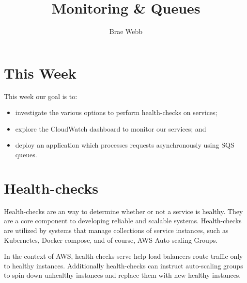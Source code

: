 \documentclass{csse4400}
\title{Monitoring \& Queues}
\author{Brae Webb}
\date{\week{6}}
\begin{document}
\maketitle

\section{This Week}
This week our goal is to:
\begin{itemize}
  \item investigate the various options to perform health-checks on services;
  \item explore the CloudWatch dashboard to monitor our services; and
  \item deploy an application which processes requests asynchronously using SQS queues.
\end{itemize}


\section{Health-checks}
Health-checks are an way to determine whether or not a service is healthy.
They are a core component to developing reliable and scalable systems.
Health-checks are utilized by systems that manage collections of service instances,
such as Kubernetes, Docker-compose, and of course, AWS Auto-scaling Groups.

In the context of AWS,
health-checks serve help load balancers route traffic only to healthy instances.
Additionally health-checks can instruct auto-scaling groups to spin down unhealthy instances and replace them with new healthy instances.




\end{document}
